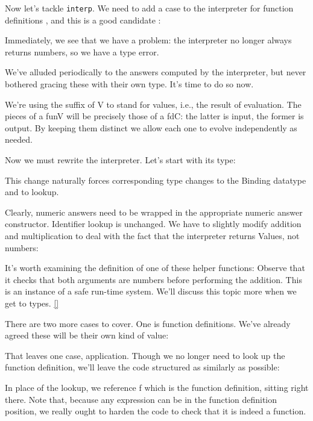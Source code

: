 Now let’s tackle  \verb|interp|. We need to add
a case to the interpreter for function definitions , and this is a good
candidate :

Immediately, we see that we have a problem: the interpreter no longer always
returns numbers, so we have a type error.

We’ve alluded periodically to the answers computed by the interpreter, but never
bothered gracing these with their own type. It’s time to do so now.

We’re using the suffix of V to stand for values, i.e., the result of evaluation.
The pieces of a funV will be precisely those of a fdC: the latter is input, the
former is output. By keeping them distinct we allow each one to evolve
independently as needed.

Now we must rewrite the interpreter. Let’s start with its type:

This change naturally forces corresponding type changes to the Binding datatype
and to lookup.


Clearly, numeric answers need to be wrapped in the appropriate numeric answer
constructor. Identifier lookup is unchanged. We have to slightly modify addition
and multiplication to deal with the fact that the interpreter returns Values,
not numbers:

It’s worth examining the definition of one of these helper functions:
Observe that it checks that both arguments are numbers before performing the
addition. This is an instance of a safe run-time system. We’ll discuss this
topic more when we get to types. \ref{}

There are two more cases to cover. One is function definitions. We’ve already
agreed these will be their own kind of value:

That leaves one case, application. Though we no longer need to look up the
function definition, we’ll leave the code structured as similarly as possible:

In place of the lookup, we reference f which is the function definition, sitting
right there. Note that, because any expression can be in the function definition
position, we really ought to harden the code to check that it is indeed a
function.

